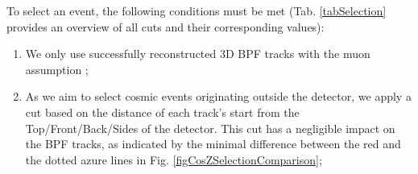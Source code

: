 \documentclass[12pt]{article}
\begin{document}
To select an event, the following conditions must be met (Tab. \ref{tabSelection} provides an overview of all cuts and their corresponding values):
\begin{enumerate}
\item We only use successfully reconstructed 3D BPF tracks with the muon assumption \cite{NOVA-doc-32455-v1};
\item As we aim to select cosmic events originating outside the detector, we apply a cut based on the distance of each track's start from the Top/Front/Back/Sides of the detector. This cut has a negligible impact on the BPF tracks, as indicated by the minimal difference between the red and the dotted azure lines in Fig. \ref{figCosZSelectionComparison};

\begin{figure}[!ht]


\end{figure}
\end{enumerate}
\end{document}
